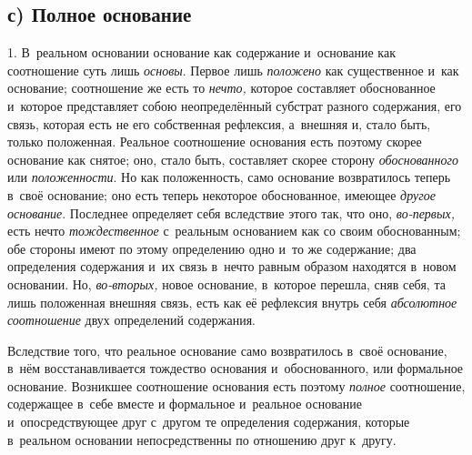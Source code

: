 \subsection[с) Полное основание]{с) Полное основание}

1. В~реальном основании основание как содержание
и~основание как соотношение суть лишь {\em основы}.
Первое лишь {\em положено} как существенное и~как
основание; соотношение же есть то {\em нечто,} которое
составляет обоснованное и~которое представляет собою неопределённый
субстрат разного содержания, его связь, которая есть не его собственная
рефлексия, а~внешняя и, стало быть, только положенная. Реальное соотношение
основания есть поэтому скорее основание как снятое; оно, стало быть,
составляет скорее сторону {\em обоснованного} или
{\em положенности}. Но как положенность, само основание
возвратилось теперь в~своё основание; оно есть теперь некоторое
обоснованное, имеющее {\em другое основание}. Последнее
определяет себя вследствие этого так, что оно,
{\em во-первых,} есть нечто
{\em тождественное} с~реальным основанием как со своим
обоснованным; обе стороны имеют по этому определению одно и~то же
содержание; два определения содержания и~их связь в~нечто равным образом
находятся в~новом основании. Но, {\em во-вторых,} новое
основание, в~которое перешла, сняв себя, та лишь положенная внешняя связь,
есть как её рефлексия внутрь себя {\em абсолютное
соотношение} двух определений содержания.

Вследствие того, что реальное основание само возвратилось в~своё основание,
в~нём восстанавливается тождество основания и~обоснованного, или формальное
основание. Возникшее соотношение основания есть поэтому
{\em полное} соотношение, содержащее в~себе вместе и
формальное и~реальное основание и~опосредствующее друг с~другом те
определения содержания, которые в~реальном основании непосредственны по
отношению друг к~другу.

